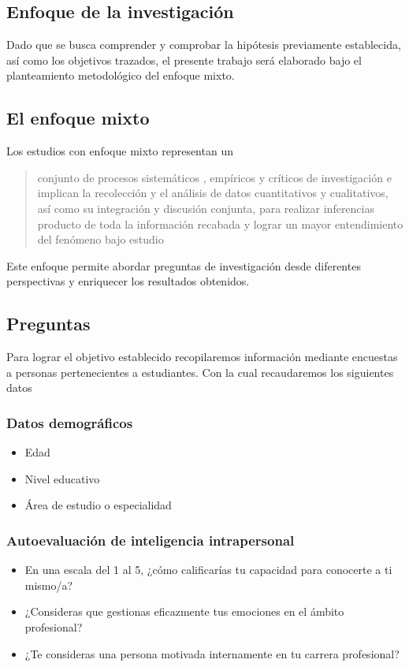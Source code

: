\subsection{Enfoque de la investigación}
Dado que se busca comprender y comprobar la hipótesis previamente establecida,
así como los objetivos trazados, el presente trabajo será elaborado bajo el
planteamiento metodológico del enfoque mixto.
\subsection{El enfoque mixto}
Los estudios con enfoque mixto representan un 
\begin{quote}
conjunto de procesos sistemáticos , empíricos y críticos de investigación e
implican la recolección y el análisis de datos cuantitativos y cualitativos, así
como su integración y discusión conjunta, para realizar inferencias producto de
toda la información recabada y lograr un mayor entendimiento del fenómeno bajo
estudio \parencite{unitec}
\end{quote}
Este enfoque permite abordar preguntas de investigación desde diferentes
perspectivas y enriquecer los resultados obtenidos.
\subsection{Preguntas}
Para lograr el objetivo establecido recopilaremos información mediante encuestas
a personas pertenecientes a estudiantes. Con la cual recaudaremos los siguientes
datos
\subsubsection{Datos demogr\'aficos}
\begin{itemize}
\item Edad
\item Nivel educativo
\item \'Area de estudio o especialidad
\end{itemize}
\subsubsection{Autoevaluaci\'on de inteligencia intrapersonal}
\begin{itemize}
\item  En una escala del 1 al 5, ¿cómo calificarías tu capacidad para conocerte a ti mismo/a?
\item  ¿Consideras que gestionas eficazmente tus emociones en el ámbito profesional? 
\item  ¿Te consideras una persona motivada internamente en tu carrera profesional? 
\end{itemize}
